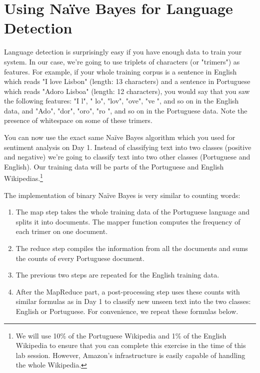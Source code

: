\section{Using Na\"{i}ve Bayes for Language Detection}

Language detection is surprisingly easy if you have enough data to train your system. In our case, we're going to use triplets of characters (or "trimers") as features. For example, if your whole training corpus is a sentence in English which reads "I love Lisbon" (length: 13 characters) and a sentence in Portuguese which reads "Adoro Lisboa" (length: 12 characters), you would say that you saw the following features: "I l", " lo", "lov", "ove", "ve ", and so on in the English data, and "Ado", "dor", "oro", "ro ", and so on in the Portuguese data. Note the presence of whitespace on some of these trimers.

You can now use the exact same Na\"{i}ve Bayes algorithm which you used for sentiment analysis on Day 1. Instead of classifying text into two classes (positive and negative) we're going to classify text into two other classes (Portuguese and English). Our training data will be parts of the Portuguese and English Wikipedias.\footnote{We will use 10\% of the Portuguese Wikipedia and 1\% of the English Wikipedia to ensure that you can complete this exercise in the time of this lab session. However, Amazon's infrastructure is easily capable of handling the whole Wikipedia.}

The implementation of binary Na\"{i}ve Bayes is very similar to counting words:
\begin{enumerate}
	\item The map step takes the whole training data of the Portuguese language and splits it into documents. The mapper function computes the frequency of each trimer on one document.
	\item The reduce step compiles the information from all the documents and sums the counts of every Portuguese document.
	\item The previous two steps are repeated for the English training data.
	\item After the MapReduce part, a post-processing step uses these counts with similar formulas as in Day 1 to classify new unseen text into the two classes: English or Portuguese. For convenience, we repeat these formulas below.
\end{enumerate}


